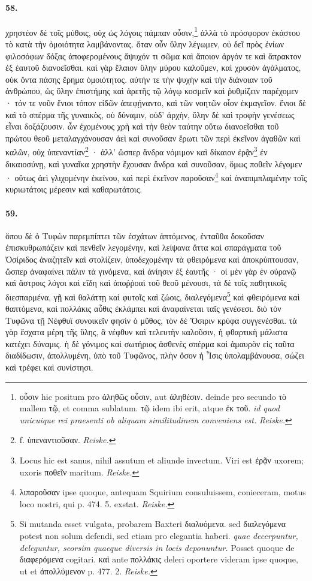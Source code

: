 \documentclass[a4paper, 11pt, oneside, polutonikogreek, german]{article}
\begin{document}
\paragraph{58.}
χρηστέον δὲ τοῖς μύθοις, οὐχ ὡς λόγοις πάμπαν οὖσιν,\footnote{οὖσιν hic positum pro ἀληθῶς οὖσιν, aut ἀληθέσιν. deinde pro secundo τὸ mallem τῷ, et comma sublatum. τῷ idem ibi erit, atque ἐκ τοῦ. \emph{id quod unicuique rei praesenti ob aliquam similitudinem conveniens est.} \emph{Reiske.}} ἀλλὰ τὸ πρόσφορον ἑκάστου τὸ κατὰ τὴν ὁμοιότητα λαμβάνοντας. ὅταν οὖν ὕλην λέγωμεν, οὐ δεῖ πρὸς ἐνίων φιλοσόφων δόξας ἀποφερομένους ἄψυχόν τι σῶμα καὶ ἄποιον ἀργόν τε καὶ ἄπρακτον ἐξ ἑαυτοῦ διανοεῖσθαι. καὶ γὰρ ἔλαιον ὕλην μύρου καλοῦμεν, καὶ χρυσὸν ἀγάλματος, οὐκ ὄντα πάσης ἔρημα ὁμοιότητος. αὐτήν τε τὴν ψυχὴν καὶ τὴν διάνοιαν τοῦ ἀνθρώπου, ὡς ὕλην ἐπιστήμης καὶ ἀρετῆς τῷ λόγῳ κοσμεῖν καὶ ῥυθμίζειν παρέχομεν · τόν τε νοῦν ἔνιοι τόπον εἰδῶν ἀπεφῄναντο, καὶ τῶν νοητῶν οἷον ἐκμαγεῖον. ἔνιοι δὲ καὶ τὸ σπέρμα τῆς γυναικὸς, οὐ δύναμιν, οὐδ' ἀρχὴν, ὕλην δὲ καὶ τροφὴν γενέσεως εἶναι δοξάζουσιν. ὧν ἐχομένους χρὴ καὶ τὴν θεὸν ταύτην οὕτω διανοεῖσθαι τοῦ πρώτου θεοῦ μεταλαγχάνουσαν ἀεὶ καὶ συνοῦσαν ἔρωτι τῶν περὶ ἐκεῖνον ἀγαθῶν καὶ καλῶν, οὐχ ὑπεναντίαν\footnote{f. ὑπεναντιοῦσαν. \emph{Reiske.}} · ἀλλ' ὥσπερ ἄνδρα νόμιμον καὶ δίκαιον ἐρᾷν\footnote{Locus hic est sanus, nihil assutum et aliunde invectum. Viri est ἐρᾷν uxorem; uxoris ποθεῖν maritum. \emph{Reiske.}} ἐν δικαιοσύνῃ, καὶ γυναῖκα χρηστὴν ἔχουσαν ἄνδρα καὶ συνοῦσαν, ὅμως ποθεῖν λέγομεν · οὕτως ἀεὶ γλιχομένην ἐκείνου, καὶ περὶ ἐκεῖνον παροῦσαν\footnote{λιπαροῦσαν ipse quoque, antequam Squirium consuluissem, conieceram, motus loco nostri, qui p. 474. 5. exstat. \emph{Reiske.}} καὶ ἀναπιμπλαμένην τοῖς κυριωτάτοις μέρεσιν καὶ καθαρωτάτοις.

\paragraph{59.}
ὅπου δὲ ὁ Τυφὼν παρεμπίπτει τῶν ἐσχάτων ἁπτόμενος, ἐνταῦθα δοκοῦσαν ἐπισκυθρωπάζειν καὶ πενθεῖν λεγομένην, καὶ λείψανα ἄττα καὶ σπαράγματα τοῦ Ὀσίριδος ἀναζητεῖν καὶ στολίζειν, ὑποδεχομένην τὰ φθειρόμενα καὶ ἀποκρύπτουσαν, ὥσπερ ἀναφαίνει πάλιν τὰ γινόμενα, καὶ ἀνίησιν ἐξ ἑαυτῆς · οἱ μὲν γὰρ ἐν οὐρανῷ καὶ ἄστροις λόγοι καὶ εἴδη καὶ ἀποῤῥοαὶ τοῦ θεοῦ μένουσι, τὰ δὲ τοῖς παθητικοῖς διεσπαρμένα, γῇ καὶ θαλάττῃ καὶ φυτοῖς καὶ ζώοις, διαλεγόμενα\footnote{Si mutanda esset vulgata, probarem Baxteri διαλυόμενα. sed διαλεγόμενα potest non solum defendi, sed etiam pro elegantia haberi. \emph{quae decerpuntur, deleguntur, seorsim quaeque diversis in locis deponuntur.} Posset quoque de διαφερόμενα cogitari. καὶ ante πολλάκις deleri oportere videram ipse quoque, ut et ἀπολλύμενον p. 477. 2. \emph{Reiske.}} καὶ φθειρόμενα καὶ θαπτόμενα, καὶ πολλάκις αὖθις ἐκλάμπει καὶ ἀναφαίνεται ταῖς γενέσεσι. διὸ τὸν Τυφῶνα τῇ Νέφθυϊ συνοικεῖν φησὶν ὁ μῦθος, τὸν δὲ Ὄσιριν κρύφα συγγενέσθαι. τὰ γὰρ ἔσχατα μέρη τῆς ὕλης, ἃ νέφθυν καὶ τελευτὴν καλοῦσιν, ἡ φθαρτικὴ μάλιστα κατέχει δύναμις. ἡ δὲ γόνιμος καὶ σωτήριος ἀσθενὲς σπέρμα καὶ ἀμαυρὸν εἰς ταῦτα διαδίδωσιν, ἀπολλυμένη, ὑπὸ τοῦ Τυφῶνος, πλὴν ὅσον ἡ Ἶσις ὑπολαμβάνουσα, σώζει καὶ τρέφει καὶ συνίστησι.
\end{document}
